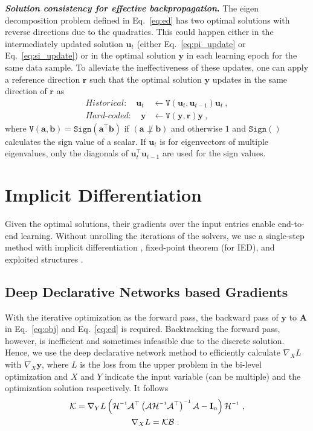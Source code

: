 \documentclass{article}
\newcommand{\mb}[1]{\mathbf{#1}}
\newcommand{\mc}[1]{\mathcal{#1}}
\newcommand{\inv}{^{\raisebox{.2ex}{$\scriptscriptstyle-1$}}}
\theoremstyle{plain}
\theoremstyle{definition}
\theoremstyle{remark}
\begin{document}
\textbf{\textit{Solution consistency for effective backpropagation}.}
The eigen decomposition problem defined in Eq.~\eqref{eq:ed} has two optimal solutions with reverse directions due to the quadratics.
This could happen either in the intermediately updated solution $\mb{u}_t$ (either Eq.~\eqref{eq:pi_update} or Eq.~\eqref{eq:si_update}) or in the optimal solution $\mb{y}$ in each learning epoch for the same data sample.
To alleviate the ineffectiveness of these updates, one can apply a reference direction $\mb{r}$
such that the optimal solution $\mb{y}$ updates in the same direction of $\mb{r}$ as
%
\begin{align}
    \textit{Historical}: \quad \mb{u}_t &\leftarrow \texttt{V}\left( \mb{u}_t, \mb{u}_{t-1} \right) \mb{u}_t\ ,\\
    \textit{Hard-coded}: \quad \mb{y} &\leftarrow \texttt{V}\left( \mb{y}, \mb{r} \right) \mb{y}\ ,
\end{align}
where $\texttt{V}(\mb{a}, \mb{b})=\texttt{Sign} \left( \mb{a}^\top \mb{b} \right)$ if $(\mb{a} \not\perp \mb{b})$ and otherwise $1$ and $\texttt{Sign}()$ calculates the sign value of a scalar. If $\mb{u}_t$ is for eigenvectors of multiple eigenvalues, only the diagonals of $\mb{u}_t^\top \mb{u}_{t-1}$ are used for the sign values.
\vspace{-2mm}

\section{Implicit Differentiation}
Given the optimal solutions, their gradients over the input entries enable end-to-end learning.
Without unrolling the iterations of the solvers, we use a single-step method with implicit differentiation \cite{ddn}, fixed-point theorem (for IED), and exploited structures \cite{exploit}.

\subsection{Deep Declarative Networks based Gradients}
\label{sec:ddn}
With the iterative optimization as the forward pass, the backward pass of $\mb{y}$ to $\mb{A}$ in Eq.~\eqref{eq:obj} and Eq.~\eqref{eq:ed} is required.
Backtracking the forward pass, however, is inefficient and sometimes infeasible due to the discrete solution.
Hence, we use the deep declarative network method \cite{ddn} to efficiently calculate $\nabla_X L$ with $\nabla_X \mb{y}$, where $L$ is the loss from the upper problem in the bi-level optimization and $X$ and $Y$ indicate the input variable (can be multiple) and the optimization solution respectively.
It follows
%
\begin{align}
\mc{K} = \nabla_Y L &\left( \mc{H}\inv \mc{A}^\top \left( \mc{A} \mc{H}\inv \mc{A}^\top \right)\inv \mc{A} - \mb{I}_n \right) \mc{H}\inv \label{eq:k_comp} \ ,\\
&\qquad \quad \nabla_X L = \mc{K} \mc{B} \label{eq:backward_ddn}\ .
\end{align}
\end{document}
